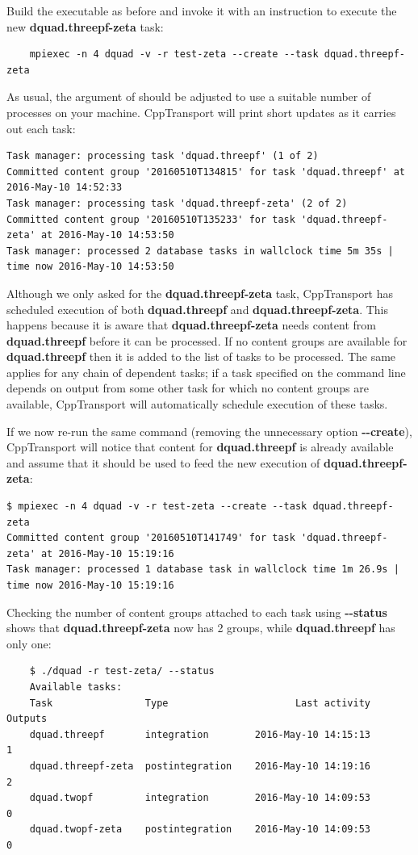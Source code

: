\documentclass[11pt,a4paper]{article}
\renewcommand{\texttt}[1]{{\ttfamily\fontseries{l}\selectfont{#1}}}
\newcommand{\repoobject}[1]{{\ttfamily\bfseries\small #1}}
\newcommand{\packagefont}{\sffamily}
\newcommand{\CppTransport}{{\packagefont CppTransport}}
\newcommand{\file}[1]{\texttt{{#1}}}
\newcommand{\option}[1]{{\ttfamily\bfseries\small #1}}
\begin{document}
Build the \file{dquad} executable as before and invoke it
with an instruction to execute the
new \repoobject{dquad.threepf-zeta} task:
\begin{verbatim}
    mpiexec -n 4 dquad -v -r test-zeta --create --task dquad.threepf-zeta    
\end{verbatim}
As usual, the \texttt{-n} argument of
\texttt{mpiexec} should be adjusted to use a suitable
number of processes on your machine.
{\CppTransport} will print short updates as it carries out each
task:
\begin{verbatim}
Task manager: processing task 'dquad.threepf' (1 of 2)
Committed content group '20160510T134815' for task 'dquad.threepf' at 2016-May-10 14:52:33
Task manager: processing task 'dquad.threepf-zeta' (2 of 2)
Committed content group '20160510T135233' for task 'dquad.threepf-zeta' at 2016-May-10 14:53:50
Task manager: processed 2 database tasks in wallclock time 5m 35s | time now 2016-May-10 14:53:50    
\end{verbatim}
Although we only asked for the
\repoobject{dquad.threepf-zeta} task,
{\CppTransport} has scheduled execution of both
\repoobject{dquad.threepf} and \repoobject{dquad.threepf-zeta}.
This happens because it is aware that
\repoobject{dquad.threepf-zeta} needs content
from \repoobject{dquad.threepf} before it can be processed.
If no content groups are available for
\repoobject{dquad.threepf} then it is added to the list of tasks
to be processed.
The same applies for any chain of dependent tasks;
if a task specified on the command line depends on output from
some other task for which no content groups are available,
{\CppTransport} will automatically schedule execution of these tasks.

If we now re-run the same command
(removing the unnecessary option \option{{-}{-}create}),
{\CppTransport} will notice that
content for \repoobject{dquad.threepf} is already available
and assume that it should be used to feed
the new execution of
\repoobject{dquad.threepf-zeta}:
\begin{verbatim}
$ mpiexec -n 4 dquad -v -r test-zeta --create --task dquad.threepf-zeta
Committed content group '20160510T141749' for task 'dquad.threepf-zeta' at 2016-May-10 15:19:16
Task manager: processed 1 database task in wallclock time 1m 26.9s | time now 2016-May-10 15:19:16
\end{verbatim}
Checking the number of content groups attached to each task using
\option{{-}{-}status} shows that
\repoobject{dquad.threepf-zeta} now has 2 groups, while
\repoobject{dquad.threepf} has only one:
\begin{verbatim}    
    $ ./dquad -r test-zeta/ --status
    Available tasks:
    Task                Type                      Last activity  Outputs
    dquad.threepf       integration        2016-May-10 14:15:13        1
    dquad.threepf-zeta  postintegration    2016-May-10 14:19:16        2
    dquad.twopf         integration        2016-May-10 14:09:53        0
    dquad.twopf-zeta    postintegration    2016-May-10 14:09:53        0
\end{verbatim}
\end{document}
